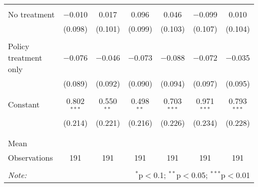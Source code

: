 \begin{tabular}{@{\extracolsep{5pt}}lcccccc}
  & & & & & & \\ 
 No treatment & $-$0.010 & 0.017 & 0.096 & 0.046 & $-$0.099 & 0.010 \\ 
  & (0.098) & (0.101) & (0.099) & (0.103) & (0.107) & (0.104) \\ 
  & & & & & & \\ 
 Policy treatment only & $-$0.076 & $-$0.046 & $-$0.073 & $-$0.088 & $-$0.072 & $-$0.035 \\ 
  & (0.089) & (0.092) & (0.090) & (0.094) & (0.097) & (0.095) \\ 
  & & & & & & \\ 
 Constant & 0.802$^{***}$ & 0.550$^{**}$ & 0.498$^{**}$ & 0.703$^{***}$ & 0.971$^{***}$ & 0.793$^{***}$ \\ 
  & (0.214) & (0.221) & (0.216) & (0.226) & (0.234) & (0.228) \\ 
  & & & & & & \\ 
\hline \\[-1.8ex] 
Mean &  &  &  &  &  &  \\ 
Observations & 191 & 191 & 191 & 191 & 191 & 191 \\ 
\hline 
\hline \\[-1.8ex] 
\textit{Note:}  & \multicolumn{6}{r}{$^{*}$p$<$0.1; $^{**}$p$<$0.05; $^{***}$p$<$0.01} \\ 
\end{tabular} 
